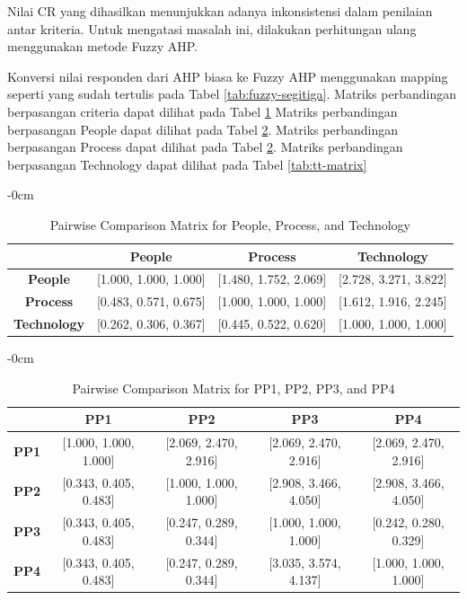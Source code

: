\documentclass[journal,article,submit,pdftex,moreauthors]{Definitions/mdpi}
\begin{document}
Nilai CR yang dihasilkan menunjukkan adanya inkonsistensi dalam penilaian antar kriteria. Untuk mengatasi masalah ini, dilakukan perhitungan ulang menggunakan metode Fuzzy AHP. 

Konversi nilai responden dari AHP biasa ke Fuzzy AHP menggunakan mapping seperti yang sudah tertulis pada Tabel \ref{tab:fuzzy-segitiga}. Matriks perbandingan berpasangan criteria dapat dilihat pada Tabel \ref{tab:pairwise-matrix-ppt} Matriks perbandingan berpasangan People dapat dilihat pada Tabel \ref{tab:pp-matrix}. Matriks perbandingan berpasangan Process dapat dilihat pada Tabel \ref{tab:pp-matrix}. Matriks perbandingan berpasangan Technology dapat dilihat pada Tabel \ref{tab:tt-matrix}


\begin{table}[h!]
\begin{adjustwidth}{-\extralength}{0cm}
    \centering
    \begin{tabular}{c|c|c|c}
    \hline
    & \textbf{People} & \textbf{Process} & \textbf{Technology} \\
    \hline
    \textbf{People} & [1.000, 1.000, 1.000] & [1.480, 1.752, 2.069] & [2.728, 3.271, 3.822] \\
    \hline
    \textbf{Process} & [0.483, 0.571, 0.675] & [1.000, 1.000, 1.000] & [1.612, 1.916, 2.245] \\
    \hline
    \textbf{Technology} & [0.262, 0.306, 0.367] & [0.445, 0.522, 0.620] & [1.000, 1.000, 1.000] \\
    \hline
    \end{tabular}
    \caption{Pairwise Comparison Matrix for People, Process, and Technology}
    \label{tab:pairwise-matrix-ppt}
\end{adjustwidth}
\end{table}


\begin{table}[h!]
\begin{adjustwidth}{-\extralength}{0cm}
    \centering
    \begin{tabular}{c|c|c|c|c}
    \hline
    & \textbf{PP1} & \textbf{PP2} & \textbf{PP3} & \textbf{PP4} \\
    \hline
    \textbf{PP1} & [1.000, 1.000, 1.000] & [2.069, 2.470, 2.916] & [2.069, 2.470, 2.916] & [2.069, 2.470, 2.916] \\
    \hline
    \textbf{PP2} & [0.343, 0.405, 0.483] & [1.000, 1.000, 1.000] & [2.908, 3.466, 4.050] & [2.908, 3.466, 4.050] \\
    \hline
    \textbf{PP3} & [0.343, 0.405, 0.483] & [0.247, 0.289, 0.344] & [1.000, 1.000, 1.000] & [0.242, 0.280, 0.329] \\
    \hline
    \textbf{PP4} & [0.343, 0.405, 0.483] & [0.247, 0.289, 0.344] & [3.035, 3.574, 4.137] & [1.000, 1.000, 1.000] \\
    \hline
    \end{tabular}
    \caption{Pairwise Comparison Matrix for PP1, PP2, PP3, and PP4}
    \label{tab:pp-matrix}
\end{adjustwidth}
\end{table}
\end{document}
